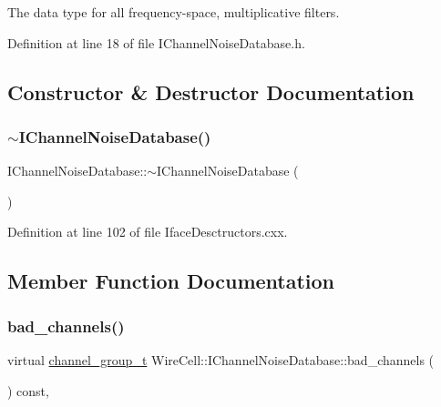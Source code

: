 The data type for all frequency-\/space, multiplicative filters. 



Definition at line 18 of file I\+Channel\+Noise\+Database.\+h.



\subsection{Constructor \& Destructor Documentation}
\mbox{\label{class_wire_cell_1_1_i_channel_noise_database_a997b922519e63f2c7e98ea6a2ee3c858}} 
\subsubsection{\texorpdfstring{$\sim$\+I\+Channel\+Noise\+Database()}{~IChannelNoiseDatabase()}}
{\footnotesize\ttfamily I\+Channel\+Noise\+Database\+::$\sim$\+I\+Channel\+Noise\+Database (\begin{DoxyParamCaption}{ }\end{DoxyParamCaption})\hspace{0.3cm}{\ttfamily [virtual]}}



Definition at line 102 of file Iface\+Desctructors.\+cxx.



\subsection{Member Function Documentation}
\mbox{\label{class_wire_cell_1_1_i_channel_noise_database_a70f4c0a24525f6a7c8ef84245fd6d01e}} 
\subsubsection{\texorpdfstring{bad\+\_\+channels()}{bad\_channels()}}
{\footnotesize\ttfamily virtual \hyperlink{class_wire_cell_1_1_i_channel_noise_database_a7fedd6ab67ba4e7eeb8cf182cc9dc6b1}{channel\+\_\+group\+\_\+t} Wire\+Cell\+::\+I\+Channel\+Noise\+Database\+::bad\+\_\+channels (\begin{DoxyParamCaption}{ }\end{DoxyParamCaption}) const\hspace{0.3cm}{\ttfamily [inline]}, {\ttfamily [virtual]}}



